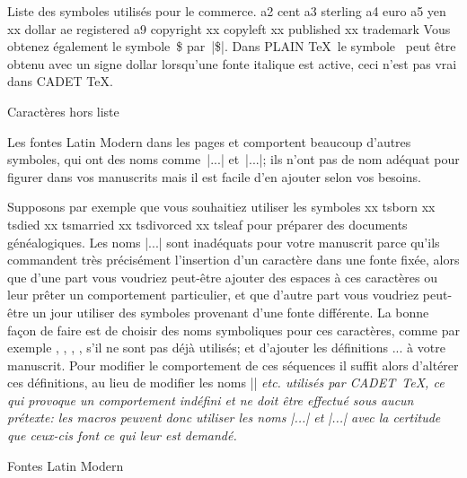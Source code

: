 \smallskip
Liste des symboles utilisés pour le commerce.
\beginchartable
a2 cent
a3 sterling
a4 euro
a5 yen
xx dollar
ae registered
a9 copyright
xx copyleft
xx published
xx trademark
\endchartable
Vous obtenez également le symbole~\$ par~|\$|. Dans PLAIN \TeX\ le
symbole \sterling\ peut être obtenu avec un signe dollar lorsqu'une
fonte italique est active, ceci n'est pas vrai dans CADET \TeX.


\formalpar Caractères hors liste

Les fontes Latin Modern dans les pages  et  comportent
beaucoup d'autres symboles, qui ont des noms comme~|\tl...|
et~|\ts...|; ils n'ont pas de nom adéquat pour figurer dans vos
manuscrits mais il est facile d'en ajouter selon vos besoins.

Supposons par exemple que vous souhaitiez utiliser les symboles
\beginchartable
xx tsborn
xx tsdied
xx tsmarried
xx tsdivorced
xx tsleaf
\endchartable
pour préparer des documents généalogiques. Les noms |\ts...| sont
inadéquats pour votre manuscrit parce qu'ils commandent très
précisément l'insertion d'un caractère dans une fonte fixée, alors que
d'une part vous voudriez peut-être ajouter des espaces à ces
caractères ou leur prêter un comportement particulier, et que d'autre
part vous voudriez peut-être un jour utiliser des symboles provenant
d'une fonte différente. La bonne façon de faire est de choisir des
noms symboliques pour ces caractères, comme par exemple ,
, , ,  s'il ne sont pas
déjà utilisés; et d'ajouter les définitions
\begincode
\def\born{\tsborn}
\def\died{\tsdied}
...
\endcode
à votre manuscrit. Pour modifier le comportement de ces séquences il
suffit alors d'altérer ces définitions, au lieu de modifier les noms
|\tsborn| \em{etc.} utilisés par CADET~\TeX, ce qui provoque un
comportement indéfini et ne doit être effectué sous aucun prétexte:
les macros peuvent donc utiliser les noms |\ts...| et |\tl...| avec la
certitude que ceux-cis font ce qui leur est demandé.


\formalpar  Fontes Latin Modern

\begincode
{}
\endcode

\bye


